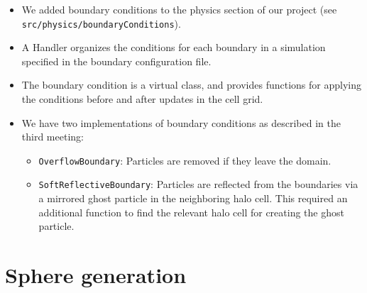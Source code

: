 \documentclass{article}
\begin{document}
\begin{itemize}
    \item We added boundary conditions to the physics section of our project (see \texttt{src/physics/boundaryConditions}).
    \item A Handler organizes the conditions for each boundary in a simulation specified in the boundary configuration file.
    \item The boundary condition is a virtual class, and provides functions for applying the conditions before and after updates in the cell grid.
    \item We have two implementations of boundary conditions as described in the third meeting:
    \begin{itemize}
        \item \texttt{OverflowBoundary}: Particles are removed if they leave the domain.
        \item \texttt{SoftReflectiveBoundary}: Particles are reflected from the boundaries via a mirrored ghost particle in the neighboring halo cell. This required an additional function to find the relevant halo cell for creating the ghost particle.
    \end{itemize}
\end{itemize}

\section{Sphere generation}
\label{sec:sphere}
\end{document}
